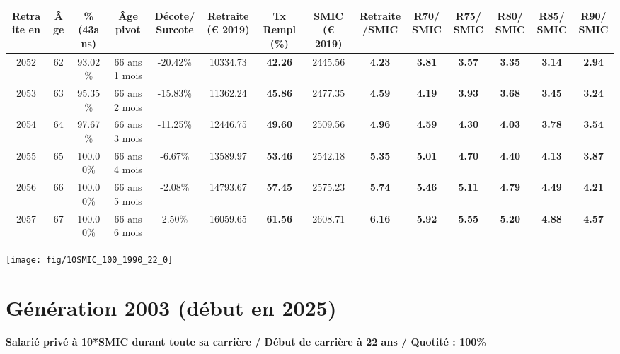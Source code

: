 \begin{adjustbox}{max width=\textwidth} 
\begin{tabular}[htb]{|c|c||c|c|c||c|c||c|c||c|c|c|c|c|} 
\hline 
 Retraite en &  Âge &  \%(43ans) &  Âge pivot &  Décote/Surcote &  Retraite (\euro{} 2019) &  Tx Rempl(\%) &  SMIC (\euro{} 2019) &  Retraite/SMIC &  R70/SMIC &  R75/SMIC &  R80/SMIC &  R85/SMIC &  R90/SMIC \\ 
\hline \hline 
 2052 &  62 &  93.02\% &  66 ans 1 mois &  -20.42\% &  10334.73 &  {\bf 42.26} &  2445.56 &  {\bf 4.23} &  {\bf 3.81} &  {\bf 3.57} &  {\bf 3.35} &  {\bf 3.14} &  {\bf 2.94} \\ 
\hline 
 2053 &  63 &  95.35\% &  66 ans 2 mois &  -15.83\% &  11362.24 &  {\bf 45.86} &  2477.35 &  {\bf 4.59} &  {\bf 4.19} &  {\bf 3.93} &  {\bf 3.68} &  {\bf 3.45} &  {\bf 3.24} \\ 
\hline 
 2054 &  64 &  97.67\% &  66 ans 3 mois &  -11.25\% &  12446.75 &  {\bf 49.60} &  2509.56 &  {\bf 4.96} &  {\bf 4.59} &  {\bf 4.30} &  {\bf 4.03} &  {\bf 3.78} &  {\bf 3.54} \\ 
\hline 
 2055 &  65 &  100.00\% &  66 ans 4 mois &  -6.67\% &  13589.97 &  {\bf 53.46} &  2542.18 &  {\bf 5.35} &  {\bf 5.01} &  {\bf 4.70} &  {\bf 4.40} &  {\bf 4.13} &  {\bf 3.87} \\ 
\hline 
 2056 &  66 &  100.00\% &  66 ans 5 mois &  -2.08\% &  14793.67 &  {\bf 57.45} &  2575.23 &  {\bf 5.74} &  {\bf 5.46} &  {\bf 5.11} &  {\bf 4.79} &  {\bf 4.49} &  {\bf 4.21} \\ 
\hline 
 2057 &  67 &  100.00\% &  66 ans 6 mois &  2.50\% &  16059.65 &  {\bf 61.56} &  2608.71 &  {\bf 6.16} &  {\bf 5.92} &  {\bf 5.55} &  {\bf 5.20} &  {\bf 4.88} &  {\bf 4.57} \\ 
\hline 
\hline 
\end{tabular} 
\end{adjustbox} 
 
 \vspace{0.1cm} 

 {\hspace{-2.2cm}\texttt{[image: fig/10SMIC\_100\_1990\_22\_0]}} 

\newpage 
 
\section{Génération 2003 (début en 2025)\label{10SMIC_100_2003_22_0}} 
 
{\bf \noindent Salarié privé à 10*SMIC durant toute sa carrière / Début de carrière à 22 ans / Quotité : 100\%}  ~ 

